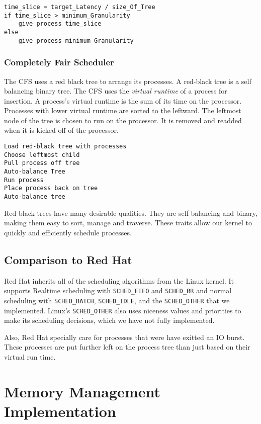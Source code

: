 \documentclass[12pt]{article}
\begin{document}
\singlespacing
\begin{lstlisting}
time_slice = target_Latency / size_Of_Tree
if time_slice > minimum_Granularity
	give process time_slice
else
	give process minimum_Granularity
\end{lstlisting}
\doublespacing


\subsubsection{Completely Fair Scheduler}
The CFS uses a red black tree to arrange its processes. A red-black tree is a self balancing binary tree. The CFS uses the \textit{virtual runtime} of a process for insertion. A process's virtual runtime is the sum of its time on the processor. Processes with lower virtual runtime are sorted to the leftward. The leftmost node of the tree is chosen to run on the processor. It is removed and readded when it is kicked off of the processor.

\singlespacing
\begin{lstlisting}
Load red-black tree with processes
Choose leftmost child
Pull process off tree
Auto-balance Tree
Run process
Place process back on tree
Auto-balance tree
\end{lstlisting}
\doublespacing

Red-black trees have many desirable qualities. They are self balancing and binary, making them easy to sort, manage and traverse. These traits allow our kernel to quickly and efficiently schedule processes.

\subsection{Comparison to Red Hat}
Red Hat inherits all of the scheduling algorithms from the Linux kernel. It supports Realtime scheduling with \lstinline|SCHED_FIFO| and \lstinline|SCHED_RR| and normal scheduling with \lstinline|SCHED_BATCH|,  \lstinline|SCHED_IDLE|, and  the \lstinline|SCHED_OTHER| that we implemented. Linux's \lstinline|SCHED_OTHER| also uses niceness values and priorities to make its scheduling decisions, which we have not fully implemented.

Also, Red Hat specially care for processes that were have exitted an IO burst. These processes are put further left on the process tree than just based on their virtual run time.

\section{Memory Management Implementation}
\end{document}

